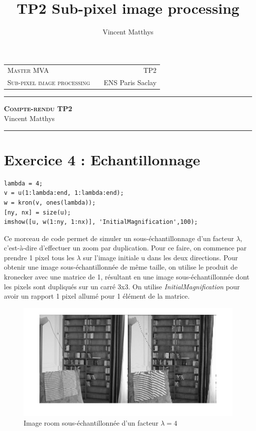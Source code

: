 \documentclass[12pt,a4paper,onecolumn]{article}
\title{TP2 Sub-pixel image processing}
\author{Vincent Matthys}
\begin{document}
\begin{tabularx}{0.8\textwidth}{@{} l X r @{} }
	{\textsc{Master MVA}}               &  & \textsc{TP2}       \\
	\textsc{Sub-pixel image processing} &  & {ENS Paris Saclay} \\
\end{tabularx}
\vspace{1.5cm}
\begin{center}

	\rule[11pt]{5cm}{0.5pt}

	\textbf{\LARGE \textsc{Compte-rendu TP2}}
	\vspace{0.5cm}\\
	Vincent Matthys\\
	\rule{5cm}{0.5pt}

	\vspace{1.5cm}
\end{center}

\section*{Exercice 4 : Echantillonnage}

\begin{lstlisting}[caption = {Zoom par duplication}]
lambda = 4;
v = u(1:lambda:end, 1:lambda:end);
w = kron(v, ones(lambda));
[ny, nx] = size(u);
imshow([u, w(1:ny, 1:nx)], 'InitialMagnification',100);
\end{lstlisting}
Ce morceau de code permet de simuler un sous-échantillonnage d'un facteur $\lambda$, c'est-à-dire d'effectuer un zoom par duplication. Pour ce faire, on commence par prendre 1 pixel tous les $\lambda$ sur l'image initiale u dans les deux directions. Pour obtenir une image sous-échantillonnée de même taille, on utilise le produit de kronecker avec une matrice de 1, résultant en une image sous-échantillonnée dont les pixels sont dupliqués sur un carré 3x3. On utilise \textit{InitialMagnification} pour avoir un rapport 1 pixel allumé pour 1 élément de la matrice.

\begin{figure}[H]
	\begin{center}
		\includegraphics[width = \textwidth]{ex4_1.jpg}
	\end{center}
	\caption{Image room sous-échantillonnée d'un facteur $\lambda = 4$}
	\label{room_l_4}
\end{figure}
\end{document}
